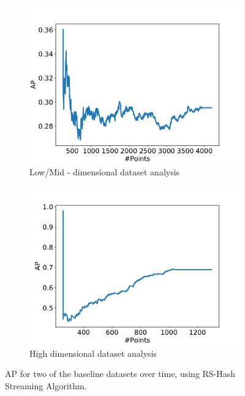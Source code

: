 \begin{figure}[ht!]
    \centering
    \begin{subfigure}[t]{0.48\textwidth}
        \centering
        \includegraphics[width=\linewidth]{fig/streaming_baseline/letter-recognition.pdf}
        \caption{Low/Mid - dimensional dataset analysis}
    \end{subfigure}
    \hfill
    \begin{subfigure}[t]{0.48\textwidth}
        \centering
        \includegraphics[width=\linewidth]{fig/streaming_baseline/madelon.pdf}
        \caption{High dimensional dataset analysis}
    \end{subfigure}
		\hfill
    \caption{AP for two of the baseline datasets over time, using RS-Hash Streaming Algorithm.}
\end{figure}

\pagebreak
